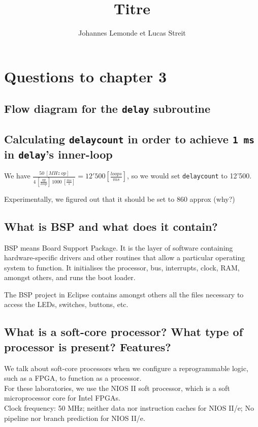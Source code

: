 \documentclass[a4paper,10pt]{article}
\title{Titre}
\author{Johannes Lemonde et Lucas Streit}
\begin{document}
\maketitle


\section{Questions to chapter 3}
\subsection{Flow diagram for the \texttt{delay} subroutine}

\subsection{Calculating \texttt{delaycount} in order to achieve \texttt{1 ms} in \texttt{delay}'s inner-loop}

We have \( \frac{50~[MHz~op]}{4~[\frac{op}{loop}]~1000~[\frac{ms}{s}]} = 12'500 [\frac{loops}{ms}] \), so we would set \texttt{delaycount} to 12'500.

Experimentally, we figured out that it should be set to 860 approx (why?)

\subsection{What is BSP and what does it contain?}

BSP means Board Support Package. It is the layer of software containing hardware-specific drivers and other routines that allow a particular operating system to function. It initialises the processor, bus, interrupts, clock, RAM, amongst others, and runs the boot loader.

The BSP project in Eclipse contains amongst others all the files necessary to access the LEDs, switches, buttons, etc.

\subsection{What is a soft-core processor? What type of processor is present? Features?}

We talk about soft-core processors when we configure a reprogrammable logic, such as a FPGA, to function as a processor. \\
For these laboratories, we use the NIOS II soft processor, which is a soft microprocessor core for Intel FPGAs.\\
Clock frequency: 50 MHz; neither data nor instruction caches for NIOS  II/e; No pipeline nor branch prediction for NIOS II/e.
\end{document}
